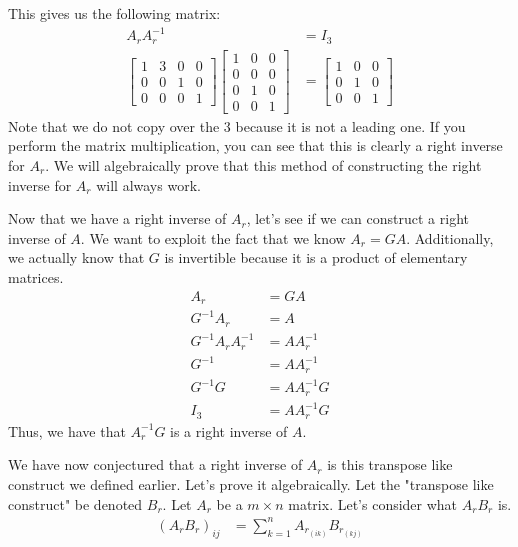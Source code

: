 \begin{example}
    This gives us the following matrix:
        \begin{align*}
        A_rA_r^{-1}&=I_3\\
        \begin{bmatrix}
        1 & 3 & 0 & 0\\
        0 & 0 & 1 & 0\\
        0 & 0 & 0 &1
    \end{bmatrix}\begin{bmatrix}
        1 & 0 & 0\\
        0 & 0 & 0\\
        0 & 1 & 0\\
        0 & 0 & 1
    \end{bmatrix}&=\begin{bmatrix}
        1 & 0 & 0\\
        0 & 1 & 0\\
        0 & 0 & 1
    \end{bmatrix}
    \end{align*}
    Note that we do not copy over the $3$ because it is not a leading one. If you perform the matrix multiplication, you can see that this is clearly a right inverse for $A_r$. We will algebraically prove that this method of constructing the right inverse for $A_r$ will always work.

    Now that we have a right inverse of $A_r$, let's see if we can construct a right inverse of $A$. We want to exploit the fact that we know $A_r=GA$. Additionally, we actually know that $G$ is invertible because it is a product of elementary matrices.
    \begin{align*}
        A_r&=GA\\
        G^{-1}A_r&=A\\
        G^{-1}A_rA_r^{-1}&=AA_r^{-1}\\
        G^{-1}&=AA_r^{-1}\\
        G^{-1}G&=AA_r^{-1}G\\
        I_3&=AA_r^{-1}G
    \end{align*}
    Thus, we have that $A_r^{-1}G$ is a right inverse of $A$.
\end{example}
We have now conjectured that a right inverse of $A_r$ is this transpose like construct we defined earlier. Let's prove it algebraically. Let the "transpose like construct" be denoted $B_r$. Let $A_r$ be a $m\times n$ matrix. Let's consider what $A_rB_r$ is.
\begin{align*}
    (A_rB_r)_{ij}&=\sum_{k=1}^n A_{r_{(ik)}}B_{r_{(kj)}}
\end{align*}
